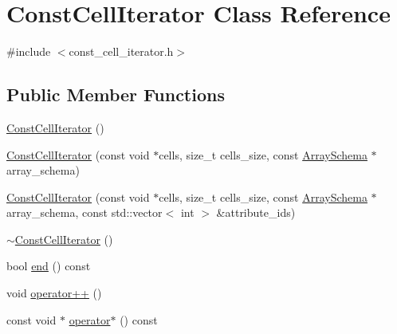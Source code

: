 \hypertarget{classConstCellIterator}{}\section{Const\+Cell\+Iterator Class Reference}
\label{classConstCellIterator}


{\ttfamily \#include $<$const\+\_\+cell\+\_\+iterator.\+h$>$}

\subsection*{Public Member Functions}
\begin{DoxyCompactItemize}
\item 
\hyperlink{classConstCellIterator_a9a711cc5586eede9dc63bb7cef0f4966}{Const\+Cell\+Iterator} ()
\item 
\hyperlink{classConstCellIterator_ac46e8f79a093643debfe14c700c4f96a}{Const\+Cell\+Iterator} (const void $\ast$cells, size\+\_\+t cells\+\_\+size, const \hyperlink{classArraySchema}{Array\+Schema} $\ast$array\+\_\+schema)
\item 
\hyperlink{classConstCellIterator_a80b816e6403dde4c58c509c00e0b4f44}{Const\+Cell\+Iterator} (const void $\ast$cells, size\+\_\+t cells\+\_\+size, const \hyperlink{classArraySchema}{Array\+Schema} $\ast$array\+\_\+schema, const std\+::vector$<$ int $>$ \&attribute\+\_\+ids)
\item 
\hyperlink{classConstCellIterator_a8ead6945445f98e801676bdc99d187ea}{$\sim$\+Const\+Cell\+Iterator} ()
\item 
bool \hyperlink{classConstCellIterator_ae9138f903e2ba0788a8b302b4a3f615a}{end} () const 
\item 
void \hyperlink{classConstCellIterator_ab44c41313f47fc30f788139c26025d54}{operator++} ()
\item 
const void $\ast$ \hyperlink{classConstCellIterator_a7b302537b92859ace3b68bba58a6b371}{operator$\ast$} () const 
\end{DoxyCompactItemize}
